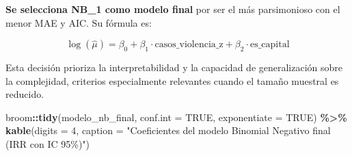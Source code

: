 \documentclass[
]{article}
\newenvironment{Shaded}{\begin{snugshade}}{\end{snugshade}}
\newcommand{\AttributeTok}[1]{\textcolor[rgb]{0.13,0.29,0.53}{#1}}
\newcommand{\ConstantTok}[1]{\textcolor[rgb]{0.56,0.35,0.01}{#1}}
\newcommand{\ControlFlowTok}[1]{\textcolor[rgb]{0.13,0.29,0.53}{\textbf{#1}}}
\newcommand{\DecValTok}[1]{\textcolor[rgb]{0.00,0.00,0.81}{#1}}
\newcommand{\FunctionTok}[1]{\textcolor[rgb]{0.13,0.29,0.53}{\textbf{#1}}}
\newcommand{\NormalTok}[1]{#1}
\newcommand{\OtherTok}[1]{\textcolor[rgb]{0.56,0.35,0.01}{#1}}
\newcommand{\SpecialCharTok}[1]{\textcolor[rgb]{0.81,0.36,0.00}{\textbf{#1}}}
\newcommand{\StringTok}[1]{\textcolor[rgb]{0.31,0.60,0.02}{#1}}
\begin{document}
\textbf{Se selecciona NB\_1 como modelo final} por ser el más
parsimonioso con el menor MAE y AIC. Su fórmula es:

\[\log(\hat{\mu}) = \beta_0 + \beta_1 \cdot \text{casos\_violencia\_z} +
\beta_2 \cdot \text{es\_capital}\]

Esta decisión prioriza la interpretabilidad y la capacidad de
generalización sobre la complejidad, criterios especialmente relevantes
cuando el tamaño muestral es reducido.

\begin{Shaded}
\end{Shaded}

\begin{Shaded}
\begin{Highlighting}[]
\NormalTok{broom}\SpecialCharTok{::}\FunctionTok{tidy}\NormalTok{(modelo\_nb\_final, }\AttributeTok{conf.int =} \ConstantTok{TRUE}\NormalTok{, }\AttributeTok{exponentiate =} \ConstantTok{TRUE}\NormalTok{) }\SpecialCharTok{\%\textgreater{}\%}
  \FunctionTok{kable}\NormalTok{(}\AttributeTok{digits =} \DecValTok{4}\NormalTok{,}
        \AttributeTok{caption =} \StringTok{"Coeficientes del modelo Binomial Negativo final (IRR con IC 95\%)"}\NormalTok{)}
\end{Highlighting}
\end{Shaded}
\end{document}
